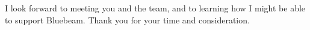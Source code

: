 I look forward to meeting you and the team, and to learning how I might be able to support Bluebeam.
Thank you for your time and consideration.


\vspace{10pt}

\makeletterclosing


